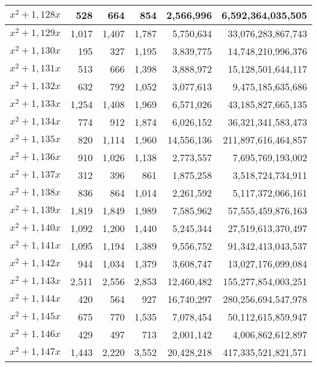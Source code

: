 \documentclass[a4paper]{amsproc}
\theoremstyle{plain}
\theoremstyle{named}
\begin{document}
\begin{longtable}{ | l | r | r | r | r | r | }
$x^2 + 1{,}128x$ & 528 & 664 & 854 & 2{,}566{,}996 & 6{,}592{,}364{,}035{,}505 \\ \hline
$x^2 + 1{,}129x$ & 1{,}017 & 1{,}407 & 1{,}787 & 5{,}750{,}634 & 33{,}076{,}283{,}867{,}743 \\ \hline
$x^2 + 1{,}130x$ & 195 & 327 & 1{,}195 & 3{,}839{,}775 & 14{,}748{,}210{,}996{,}376 \\ \hline
$x^2 + 1{,}131x$ & 513 & 666 & 1{,}398 & 3{,}888{,}972 & 15{,}128{,}501{,}644{,}117 \\ \hline
$x^2 + 1{,}132x$ & 632 & 792 & 1{,}052 & 3{,}077{,}613 & 9{,}475{,}185{,}635{,}686 \\ \hline
$x^2 + 1{,}133x$ & 1{,}254 & 1{,}408 & 1{,}969 & 6{,}571{,}026 & 43{,}185{,}827{,}665{,}135 \\ \hline
$x^2 + 1{,}134x$ & 774 & 912 & 1{,}874 & 6{,}026{,}152 & 36{,}321{,}341{,}583{,}473 \\ \hline
$x^2 + 1{,}135x$ & 820 & 1{,}114 & 1{,}960 & 14{,}556{,}136 & 211{,}897{,}616{,}464{,}857 \\ \hline
$x^2 + 1{,}136x$ & 910 & 1{,}026 & 1{,}138 & 2{,}773{,}557 & 7{,}695{,}769{,}193{,}002 \\ \hline
$x^2 + 1{,}137x$ & 312 & 396 & 861 & 1{,}875{,}258 & 3{,}518{,}724{,}734{,}911 \\ \hline
$x^2 + 1{,}138x$ & 836 & 864 & 1{,}014 & 2{,}261{,}592 & 5{,}117{,}372{,}066{,}161 \\ \hline
$x^2 + 1{,}139x$ & 1{,}819 & 1{,}849 & 1{,}989 & 7{,}585{,}962 & 57{,}555{,}459{,}876{,}163 \\ \hline
$x^2 + 1{,}140x$ & 1{,}092 & 1{,}200 & 1{,}440 & 5{,}245{,}344 & 27{,}519{,}613{,}370{,}497 \\ \hline
$x^2 + 1{,}141x$ & 1{,}095 & 1{,}194 & 1{,}389 & 9{,}556{,}752 & 91{,}342{,}413{,}043{,}537 \\ \hline
$x^2 + 1{,}142x$ & 944 & 1{,}034 & 1{,}379 & 3{,}608{,}747 & 13{,}027{,}176{,}099{,}084 \\ \hline
$x^2 + 1{,}143x$ & 2{,}511 & 2{,}556 & 2{,}853 & 12{,}460{,}482 & 155{,}277{,}854{,}003{,}251 \\ \hline
$x^2 + 1{,}144x$ & 420 & 564 & 927 & 16{,}740{,}297 & 280{,}256{,}694{,}547{,}978 \\ \hline
$x^2 + 1{,}145x$ & 675 & 770 & 1{,}535 & 7{,}078{,}454 & 50{,}112{,}615{,}859{,}947 \\ \hline
$x^2 + 1{,}146x$ & 429 & 497 & 713 & 2{,}001{,}142 & 4{,}006{,}862{,}612{,}897 \\ \hline
$x^2 + 1{,}147x$ & 1{,}443 & 2{,}220 & 3{,}552 & 20{,}428{,}218 & 417{,}335{,}521{,}821{,}571 \\ \hline

\end{longtable}
\end{document}
